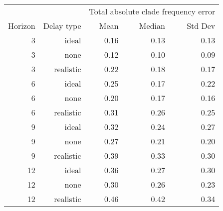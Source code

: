 
\begin{tabular*}{0.7\textwidth}{rrrrr}
\toprule
        &            & \multicolumn{3}{c}{Total absolute clade frequency error} \\
Horizon & Delay type & Mean & Median & Std Dev \\
\midrule

3 & ideal & 0.16 & 0.13 & 0.13 \\
3 & none & 0.12 & 0.10 & 0.09 \\
3 & realistic & 0.22 & 0.18 & 0.17 \\
6 & ideal & 0.25 & 0.17 & 0.22 \\
6 & none & 0.20 & 0.17 & 0.16 \\
6 & realistic & 0.31 & 0.26 & 0.25 \\
9 & ideal & 0.32 & 0.24 & 0.27 \\
9 & none & 0.27 & 0.21 & 0.20 \\
9 & realistic & 0.39 & 0.33 & 0.30 \\
12 & ideal & 0.36 & 0.27 & 0.30 \\
12 & none & 0.30 & 0.26 & 0.23 \\
12 & realistic & 0.46 & 0.42 & 0.34 \\

\bottomrule
\end{tabular*}


